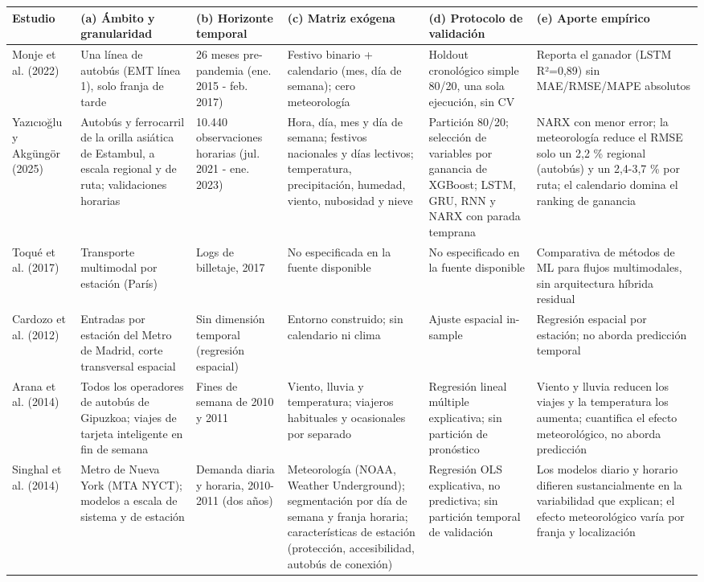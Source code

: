 \begin{tabular}{p{2.6cm}p{3.6cm}p{3.0cm}p{4.2cm}p{4.4cm}p{4.6cm}}
\toprule
\rowcolor{naranja}
\textbf{Estudio} & \textbf{(a) Ámbito y granularidad} & \textbf{(b) Horizonte temporal} & \textbf{(c) Matriz exógena} & \textbf{(d) Protocolo de validación} & \textbf{(e) Aporte empírico} \\
\midrule
\rowcolor{filaclara} Monje et al. (2022) & Una línea de autobús (EMT línea 1), solo franja de tarde & 26 meses pre-pandemia (ene. 2015 - feb. 2017) & Festivo binario + calendario (mes, día de semana); cero meteorología & Holdout cronológico simple 80/\allowbreak{}20, una sola ejecución, sin CV & Reporta el ganador (LSTM R²=0,89) sin MAE/\allowbreak{}RMSE/\allowbreak{}MAPE absolutos \\
Yazıcıoğlu y Akgüngör (2025) & Autobús y ferrocarril de la orilla asiática de Estambul, a escala regional y de ruta; validaciones horarias & 10.440 observaciones horarias (jul. 2021 - ene. 2023) & Hora, día, mes y día de semana; festivos nacionales y días lectivos; temperatura, precipitación, humedad, viento, nubosidad y nieve & Partición 80/\allowbreak{}20; selección de variables por ganancia de XGBoost; LSTM, GRU, RNN y NARX con parada temprana & NARX con menor error; la meteorología reduce el RMSE solo un 2,2 \% regional (autobús) y un 2,4-3,7 \% por ruta; el calendario domina el ranking de ganancia \\
\rowcolor{filaclara} Toqué et al. (2017) & Transporte multimodal por estación (París) & Logs de billetaje, 2017 & No especificada en la fuente disponible & No especificado en la fuente disponible & Comparativa de métodos de ML para flujos multimodales, sin arquitectura híbrida residual \\
Cardozo et al. (2012) & Entradas por estación del Metro de Madrid, corte transversal espacial & Sin dimensión temporal (regresión espacial) & Entorno construido; sin calendario ni clima & Ajuste espacial in-sample & Regresión espacial por estación; no aborda predicción temporal \\
\rowcolor{filaclara} Arana et al. (2014) & Todos los operadores de autobús de Gipuzkoa; viajes de tarjeta inteligente en fin de semana & Fines de semana de 2010 y 2011 & Viento, lluvia y temperatura; viajeros habituales y ocasionales por separado & Regresión lineal múltiple explicativa; sin partición de pronóstico & Viento y lluvia reducen los viajes y la temperatura los aumenta; cuantifica el efecto meteorológico, no aborda predicción \\
Singhal et al. (2014) & Metro de Nueva York (MTA NYCT); modelos a escala de sistema y de estación & Demanda diaria y horaria, 2010-2011 (dos años) & Meteorología (NOAA, Weather Underground); segmentación por día de semana y franja horaria; características de estación (protección, accesibilidad, autobús de conexión) & Regresión OLS explicativa, no predictiva; sin partición temporal de validación & Los modelos diario y horario difieren sustancialmente en la variabilidad que explican; el efecto meteorológico varía por franja y localización \\

\end{tabular}
